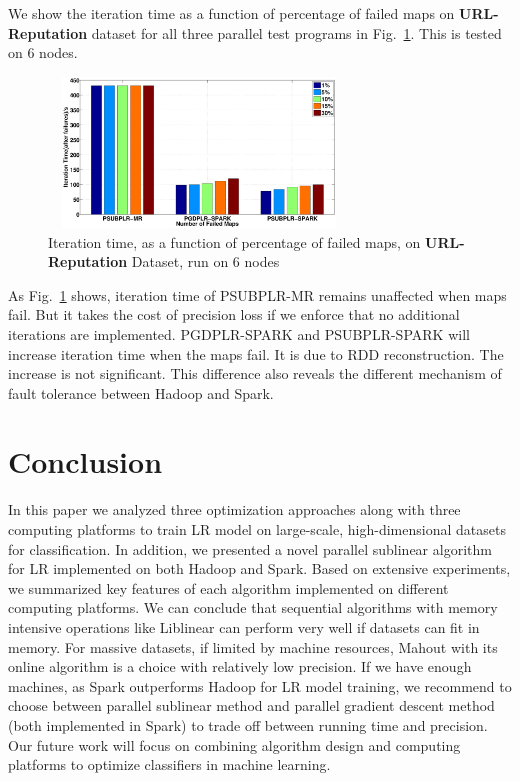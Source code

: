 \documentclass[10pt, conference, compsocconf]{IEEEtran}
\begin{document}
We show the iteration time as a function of percentage of failed maps on \textbf{URL-Reputation} dataset for all three parallel test programs in Fig.~\ref{fig:14}.
This is tested on 6 nodes.
\begin{figure}[tb]
\center \includegraphics[height=4cm,width=8cm]{img/fault_tolerance.eps}\vspace{-0.3cm}
\caption{Iteration time, as a function of percentage of failed maps, on \textbf{URL-Reputation} Dataset, run on 6 nodes}\label{fig:14}\vspace{-0.5cm}
\end{figure}
As Fig.~\ref{fig:14} shows, iteration time of PSUBPLR-MR remains unaffected when maps fail. But it takes the cost of precision loss if we enforce that no additional iterations are implemented.
PGDPLR-SPARK and PSUBPLR-SPARK will increase iteration time when the maps fail. It is due to RDD reconstruction. The increase is not significant.
This difference also reveals the different mechanism of fault tolerance between Hadoop and Spark.

\section{Conclusion} \label{sec:concl}
In this paper we analyzed three optimization approaches along with three computing platforms to train LR model on large-scale, high-dimensional datasets for classification. In addition, we presented a novel parallel sublinear algorithm for LR implemented on both Hadoop and Spark. Based on extensive experiments, we summarized key features of each algorithm implemented on different computing platforms.
We can conclude that sequential algorithms with memory intensive operations like Liblinear can perform very well if datasets can fit in memory.
For massive datasets, if limited by machine resources, Mahout with its online algorithm is a choice with relatively low precision.
If we have enough machines, as Spark outperforms Hadoop for LR model training, we recommend to choose between parallel sublinear method and parallel gradient descent method (both implemented in Spark) to trade off between running time and precision.
Our future work will focus on combining algorithm design and computing platforms to optimize classifiers in machine learning.

\begin{small}


\end{small}
\end{document}
